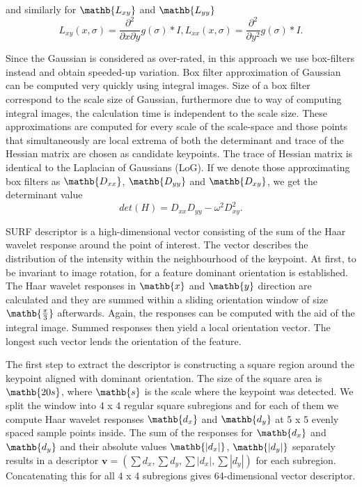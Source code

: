 and similarly for $\mathb{L_{xy}}$ and $\mathb{L_{yy}}$
\[
L_{xy}(x, \sigma) = \frac{\partial ^{2}}{\partial x \partial y}g(\sigma) * I, 
L_{xx}(x, \sigma) = \frac{\partial ^{2}}{\partial y^{2}}g(\sigma) * I.
\]

Since the Gaussian is considered as over-rated, in this approach we use box-filters instead and obtain speeded-up variation.
Box filter approximation of Gaussian can be computed very quickly using integral images. 
Size of a box filter correspond to the scale size of Gaussian, furthermore due to way of computing integral images, the calculation time is independent to the scale size.
These approximations are computed for every scale of the scale-space and 
those points that simultaneously are local extrema of both the determinant and trace of the Hessian matrix are chosen as candidate keypoints. 
The trace of Hessian matrix is identical to the Laplacian of Gaussians (LoG).
If we denote those approximating box filters as $\mathb{D_{xx}}$, $\mathb{D_{yy}}$ and $\mathb{D_{xy}}$, we get the determinant value
 \[
 det(H) =D_{xx} D_{yy} - \omega^{2} D_{xy}^{2}.
 \]

SURF descriptor is a high-dimensional vector consisting of the sum of the Haar wavelet response around the point of interest.
The vector describes the distribution of the intensity within the neighbourhood of the keypoint.
At first, to be invariant to image rotation, for a feature dominant orientation is established. 
The Haar wavelet responses in $\mathb{x}$ and $\mathb{y}$ direction are calculated 
and they are summed within a sliding orientation window of size $\mathb{\frac{\pi}{3}}$ afterwards.
Again, the responses can be computed with the aid of the integral image.
Summed responses then yield a local orientation vector. 
The longest such vector lends the orientation of the feature. 

The first step to extract the descriptor is constructing a square region around the keypoint aligned with dominant orientation.
The size of the square area is $\mathb{20s}$, where $\mathb{s}$ is the scale where the keypoint was detected.
We split the window into 4 x 4 regular square subregions and for each of them we compute Haar wavelet responses $\mathb{d_x}$ and $\mathb{d_y}$
at 5 x 5 evenly spaced sample points inside.
The sum of the responses for $\mathb{d_x}$ and $\mathb{d_y}$ and their absolute values
$\mathb{|d_x|}$, $\mathb{|d_y|}$ separately results in a descriptor 
$\mathbf{v} = (\sum{d_x}, \sum{d_y}, \sum{|d_x|}, \sum{|d_y|})$ for each subregion.
Concatenating this for all 4 x 4 subregions gives 64-dimensional vector descriptor.

